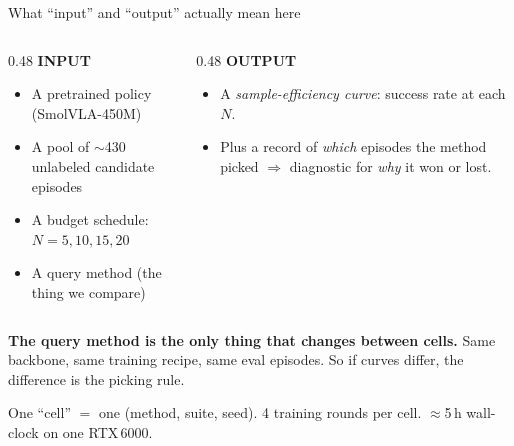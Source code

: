 \documentclass[aspectratio=169]{beamer}
\newcommand{\muted}[1]{\textcolor{muted}{#1}}
\begin{document}
\begin{frame}{What ``input'' and ``output'' actually mean here}
\begin{columns}[T]
\begin{column}{0.48\textwidth}
\textbf{INPUT}
\begin{itemize}
  \item A pretrained policy (SmolVLA-450M)
  \item A pool of $\sim$430 unlabeled candidate episodes
  \item A budget schedule: $N=5,10,15,20$
  \item A query method (the thing we compare)
\end{itemize}
\end{column}
\begin{column}{0.48\textwidth}
\textbf{OUTPUT}
\begin{itemize}
  \item A \emph{sample-efficiency curve}: success rate at each $N$.
  \item Plus a record of \emph{which} episodes the method picked $\Rightarrow$ diagnostic for \emph{why} it won or lost.
\end{itemize}
\end{column}
\end{columns}
\vspace{1em}

\textbf{The query method is the only thing that changes between cells.} Same backbone, same training recipe, same eval episodes. So if curves differ, the difference is the picking rule.

\vspace{0.5em}
\muted{\footnotesize One ``cell'' $=$ one (method, suite, seed). 4 training rounds per cell. $\approx$5\,h wall-clock on one RTX\,6000.}
\end{frame}
\end{document}
